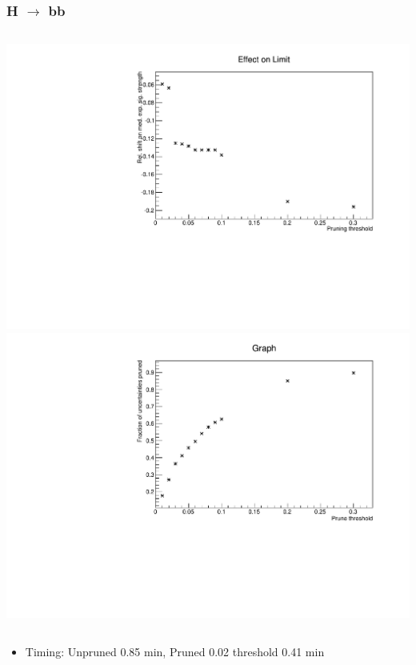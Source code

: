 \documentclass[hyperref=colorlinks]{beamer}
\begin{document}
\begin{frame}
  \frametitle{H $\rightarrow$ bb}
  \begin{columns}
    \includegraphics[width=\textwidth]{TalkPics/hbbshift.pdf}
    \includegraphics[width=\textwidth]{TalkPics/hbbprop.pdf}
  \end{columns}
  \begin{itemize}
  \item Timing: Unpruned 0.85 min, Pruned 0.02 threshold 0.41 min
  \end{itemize}
\end{frame}
\end{document}
